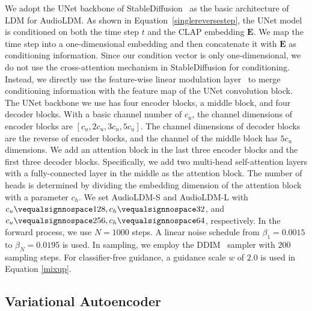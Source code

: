 We adopt the UNet backbone of StableDiffusion~\cite{rombach2022high} as the basic architecture of LDM for AudioLDM. As shown in Equation~\ref{singlereversestep}, the UNet model is conditioned on both the time step $t$ and the CLAP embedding $\boldsymbol{E}$. We map the time step into a one-dimensional embedding and then concatenate it with $\boldsymbol{E}$ as conditioning information. Since our condition vector is only one-dimensional, we do not use the cross-attention mechanism in StableDiffusion for conditioning. Instead, we directly use the feature-wise linear modulation layer~\cite{perez2018film} to merge conditioning information with the feature map of the UNet convolution block. The UNet backbone we use has four encoder blocks, a middle block, and four decoder blocks. With a basic channel number of $c_{u}$, the channel dimensions of encoder blocks are $[c_{u}, 2c_{u}, 3c_{u}, 5c_{u}]$. The channel dimensions of decoder blocks are the reverse of encoder blocks, and the channel of the middle block has $5c_{u}$ dimensions. We add an attention block in the last three encoder blocks and the first three decoder blocks. Specifically, we add two multi-head self-attention layers with a fully-connected layer in the middle as the attention block. The number of heads is determined by dividing the embedding dimension of the attention block with a parameter $c_h$. We set AudioLDM-S and AudioLDM-L with $c_{u}\vequalsignnospace128, c_h\vequalsignnospace32$, and $c_{u}\vequalsignnospace256, c_h\vequalsignnospace64$, respectively. In the forward process, we use $N=1000$ steps. A linear noise schedule from $\beta_{1}=0.0015$ to $\beta_{N}=0.0195$ is used. In sampling, we employ the DDIM~\cite{song2020denoising} sampler with $200$ sampling steps. For classifier-free guidance, a guidance scale $w$ of $2.0$ is used in Equation \ref{mixup}.

\subsection{Variational Autoencoder}
\label{app:VAE}

